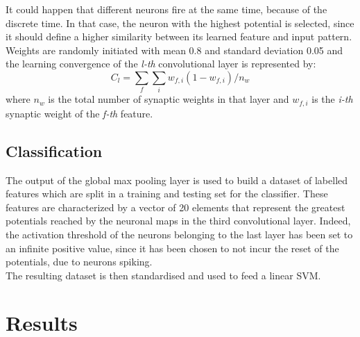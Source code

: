 \documentclass[11pt,a4paper]{scrartcl}
\begin{document}
It could happen that different neurons fire at the same time, because of the discrete time. In that case, the neuron with the highest potential is selected, since it should define a higher similarity between its learned feature and input pattern.\\
Weights are randomly initiated with mean 0.8 and standard deviation 0.05 and the learning convergence of the \textit{l-th} convolutional layer is represented by:
\begin{equation*}
C_{l} = \sum_{f}\sum_{i}w_{f,i}(1-w_{f,i})/n_{w}
\end{equation*}
where $ n_{w} $ is the total number of synaptic weights in that layer and $ w_{f,i} $ is the \textit{i-th} synaptic weight of the \textit{f-th} feature.

\subsection{Classification}
The output of the global max pooling layer is used to build a dataset of labelled features which are split in a training and testing set for the classifier. These features are characterized by a vector of 20 elements that represent the greatest potentials reached by the neuronal maps in the third convolutional layer. Indeed, the activation threshold of the neurons belonging to the last layer has been set to an infinite positive value, since it has been chosen to not incur the reset of the potentials, due to neurons spiking.\\
The resulting dataset is then standardised and used to feed a linear SVM.

\section{Results}
\end{document}

